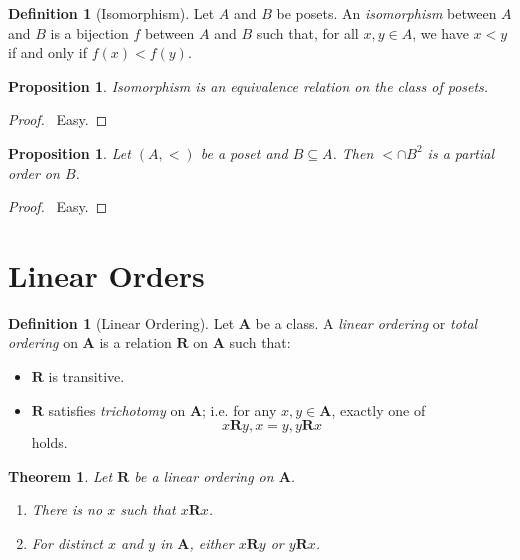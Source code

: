 \documentclass{article}
\let\qed\relax
\newtheorem{proposition}[axiom]{Proposition}
\newtheorem{theorem}[axiom]{Theorem}
\theoremstyle{definition}
\newtheorem{definition}[axiom]{Definition}
\begin{document}
    \begin{definition}[Isomorphism]
        Let $A$ and $B$ be posets. An \emph{isomorphism} between $A$ and $B$ is a bijection $f$ between $A$
        and $B$ such that, for all $x, y \in A$, we have $x < y$ if and only if $f(x) < f(y)$.
    \end{definition}

    \begin{proposition}
        Isomorphism is an equivalence relation on the class of posets.
    \end{proposition}

    \begin{proof}
        \pf\ Easy. \qed
    \end{proof}

    \begin{proposition}
        Let $(A, <)$ be a poset and $B \subseteq A$. Then $< \cap B^2$ is a partial order on $B$.
    \end{proposition}

    \begin{proof}
        \pf\ Easy. \qed
    \end{proof}

    \section{Linear Orders}

    \begin{definition}[Linear Ordering]
        Let $\mathbf{A}$ be a class. A \emph{linear ordering} or \emph{total ordering} on $\mathbf{A}$
        is a relation $\mathbf{R}$ on $\mathbf{A}$ such that:
        \begin{itemize}
            \item $\mathbf{R}$ is transitive.
            \item $\mathbf{R}$ satisfies \emph{trichotomy} on $\mathbf{A}$; i.e. for any $x, y \in \mathbf{A}$,
            exactly one of
            \[ x\mathbf{R}y, x=y, y\mathbf{R}x \]
            holds.
        \end{itemize}
    \end{definition}

    \begin{theorem}
        Let $\mathbf{R}$ be a linear ordering on $\mathbf{A}$.
        \begin{enumerate}
            \item There is no $x$ such that $x \mathbf{R} x$.
            \item For distinct $x$ and $y$ in $\mathbf{A}$, either $x\mathbf{R}y$ or $y\mathbf{R}x$.
        \end{enumerate}
    \end{theorem}
\end{document}
